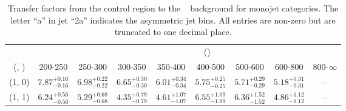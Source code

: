 \begin{table}[h!]
\tiny
\centering
\caption{Transfer factors from the \mmj control region to the \zInv~ background for monojet categories. The letter ``a'' in jet \eg ``2a''  indicates the asymmetric jet bins. All entries are non-zero but are truncated to one decimal place.\label{tab:tf_mumu_zinv_mono}}
\begin{tabular}
{ccccccccc}
	\hline\hline
&	& \multicolumn{8}{c}{\scalht (\gev)} \\ 
	 (\njet,  \nb) & 200-250 & 250-300 & 300-350 & 350-400 & 400-500 & 500-600 & 600-800 & 800-$\infty$ \\ [0.8ex] 
\hline
	(1, 0) & $7.87^{+ 0.16 }_{- 0.16 }$ & $6.98^{+ 0.22 }_{- 0.22 }$ & $6.65^{+ 0.30 }_{- 0.30 }$ & $6.01^{+ 0.34 }_{- 0.34 }$ & $5.75^{+ 0.25 }_{- 0.25 }$ & $5.71^{+ 0.29 }_{- 0.29 }$ & $5.18^{+ 0.31 }_{- 0.31 }$ & -- \\[0.5ex] 
	(1, 1) & $6.24^{+ 0.56 }_{- 0.56 }$ & $5.29^{+ 0.68 }_{- 0.68 }$ & $4.35^{+ 0.79 }_{- 0.79 }$ & $4.61^{+ 1.07 }_{- 1.07 }$ & $6.55^{+ 1.09 }_{- 1.09 }$ & $6.36^{+ 1.52 }_{- 1.52 }$ & $4.86^{+ 1.12 }_{- 1.12 }$ & -- \\[0.5ex] 
	\hline
	\hline
\end{tabular}
\end{table}
